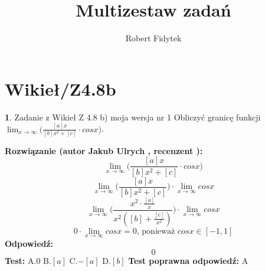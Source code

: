 \documentclass[12pt, a4paper]{article}
\title{Multizestaw zadań}
\author{Robert Fidytek}
\date{}
\theoremstyle{definition} %
\newtheorem{zad}{}
\newcommand{\kategoria}[1]{\section{#1}} %
\newcommand{\zadStart}[1]{\begin{zad}#1\newline} %
\newcommand{\zadStop}{\end{zad}}   %
\newcommand{\rozwStart}[2]{\noindent \textbf{Rozwiązanie (autor #1 , recenzent #2): }\newline} %
\newcommand{\rozwStop}{\newline}                                            %
\newcommand{\odpStart}{\noindent \textbf{Odpowiedź:}\newline}    %
\newcommand{\odpStop}{\newline}                                             %
\newcommand{\testStart}{\noindent \textbf{Test:}\newline} %
\newcommand{\testStop}{\newline} %
\newcommand{\kluczStart}{\noindent \textbf{Test poprawna odpowiedź:}\newline} %
\newcommand{\kluczStop}{\newline} %
\begin{document}
\maketitle


\kategoria{Wikieł/Z4.8b}
\zadStart{Zadanie z Wikieł Z 4.8 b) moja wersja nr 1}
Obliczyć granicę funkcji $\lim_{x \to \infty}\bigg(\frac{[a]x}{[b]x^{2}+[c]}\cdot cosx\bigg)$.
\zadStop
\rozwStart{Jakub Ulrych}{}
$$\lim_{x \to \infty}\bigg(\frac{[a]x}{[b]x^{2}+[c]}\cdot cosx\bigg)$$
$$\lim_{x \to \infty}\bigg(\frac{[a]x}{[b]x^{2}+[c]}\bigg)\cdot \lim_{x \to \infty}cosx$$
$$\lim_{x \to \infty}\bigg(\frac{x^{2}\cdot\frac{[a]}{x}}{x^{2}([b]+\frac{[c]}{x^{2}})}\bigg)\cdot \lim_{x \to \infty}cosx$$
$$0\cdot \lim_{x \to \infty}cosx=0 \text{, ponieważ }cosx\in [-1,1]$$
\rozwStop
\odpStart
$$0$$
\odpStop
\testStart
A.$0$
B.$[a]$
C.$-[a]$
D.$[b]$
\testStop
\kluczStart
A
\kluczStop
\end{document}
